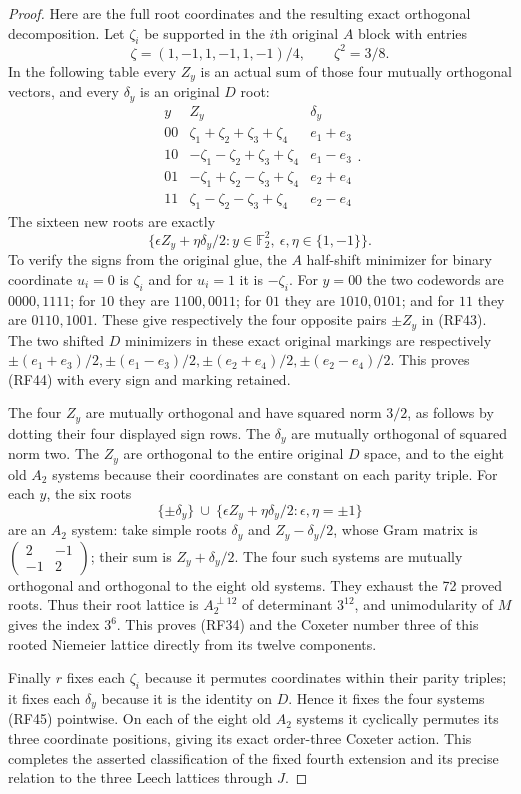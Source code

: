 \begin{proof}
Here are the full root coordinates and the resulting exact
orthogonal decomposition.
Let $\zeta_i$ be supported in the $i$th original $A$ block
with entries
\[
 \zeta=(1,-1,1,-1,1,-1)/4,\qquad \zeta^2=3/8.
\]
In the following table every $Z_y$ is an actual sum of those
four mutually orthogonal vectors, and every $\delta_y$ is
an original $D$ root:
\[
 \begin{array}{c|l|l}
 y&Z_y&\delta_y\\\hline
 00&\zeta_1+\zeta_2+\zeta_3+\zeta_4&e_1+e_3\\
 10&-\zeta_1-\zeta_2+\zeta_3+\zeta_4&e_1-e_3\\
 01&-\zeta_1+\zeta_2-\zeta_3+\zeta_4&e_2+e_4\\
 11&\zeta_1-\zeta_2-\zeta_3+\zeta_4&e_2-e_4
 \end{array}.
 \tag{RF43}
\]
The sixteen new roots are exactly
\[
 \{\epsilon Z_y+\eta\delta_y/2:
                   y\in\mathbb F_2^2,\ \epsilon,\eta\in\{1,-1\}\}.
 \tag{RF44}
\]
To verify the signs from the original glue, the $A$ half-shift
minimizer for binary coordinate $u_i=0$ is $\zeta_i$ and
for $u_i=1$ it is $-\zeta_i$.
For $y=00$ the two codewords are $0000,1111$; for $10$ they
are $1100,0011$; for $01$ they are $1010,0101$; and for $11$
they are $0110,1001$.
These give respectively the four opposite pairs $\pm Z_y$
in (RF43).
The two shifted $D$ minimizers in these exact original
markings are respectively
$\pm(e_1+e_3)/2,\pm(e_1-e_3)/2,
 \pm(e_2+e_4)/2,\pm(e_2-e_4)/2$.
This proves (RF44) with every sign and marking retained.

The four $Z_y$ are mutually orthogonal and have squared norm
$3/2$, as follows by dotting their four displayed sign rows.
The $\delta_y$ are mutually orthogonal of squared norm two.
The $Z_y$ are orthogonal to the entire original $D$ space,
and to the eight old $A_2$ systems because their coordinates
are constant on each parity triple.
For each $y$, the six roots
\[
 \{\pm\delta_y\}
       \ \cup\ \{\epsilon Z_y+\eta\delta_y/2:\epsilon,\eta=\pm1\}
 \tag{RF45}
\]
are an $A_2$ system: take simple roots
$\delta_y$ and $Z_y-\delta_y/2$, whose Gram matrix is
$\left(\begin{smallmatrix}2&-1\\-1&2\end{smallmatrix}\right)$;
their sum is $Z_y+\delta_y/2$.
The four such systems are mutually orthogonal and orthogonal
to the eight old systems. They exhaust the 72 proved roots.
Thus their root lattice is $A_2^{\perp12}$ of determinant
$3^{12}$, and unimodularity of $M$ gives the index $3^6$.
This proves (RF34) and the Coxeter number three of this
rooted Niemeier lattice directly from its twelve components.

Finally $r$ fixes each $\zeta_i$ because it permutes coordinates
within their parity triples; it fixes each $\delta_y$ because
it is the identity on $D$. Hence it fixes the four systems
(RF45) pointwise. On each of the eight old $A_2$ systems it
cyclically permutes its three coordinate positions, giving its
exact order-three Coxeter action.
This completes the asserted classification of the fixed
fourth extension and its precise relation to the three Leech
lattices through $J$.
\end{proof}
